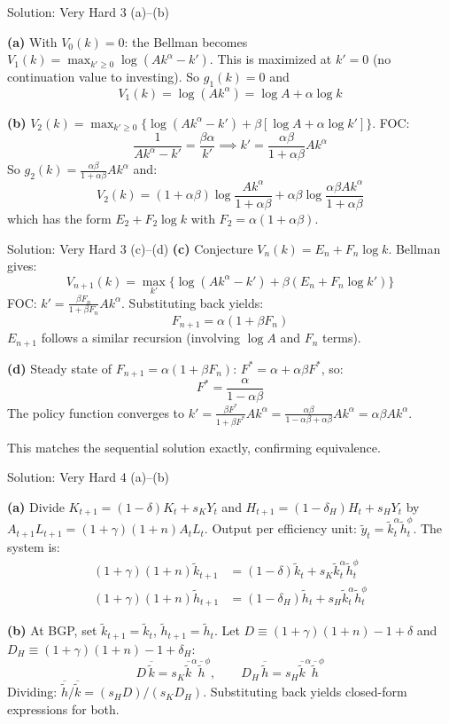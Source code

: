 \documentclass[aspectratio=169,10pt]{beamer}
\newcommand{\backbutton}[1]{\hfill\hyperlink{#1}{\beamerbutton{Back}}}
\begin{document}
\begin{frame}{Solution: Very Hard 3 (a)--(b)}
\hypertarget{s-v3}{}

\textbf{(a)} With $V_0(k)=0$: the Bellman becomes $V_1(k) = \max_{k'\geq 0}\log(Ak^\alpha - k')$. This is maximized at $k'=0$ (no continuation value to investing). So $g_1(k)=0$ and
\[
V_1(k) = \log(Ak^\alpha) = \log A + \alpha\log k
\]

\textbf{(b)} $V_2(k) = \max_{k'\geq 0}\{\log(Ak^\alpha - k') + \beta[\log A + \alpha\log k']\}$. FOC:
\[
\frac{1}{Ak^\alpha - k'} = \frac{\beta\alpha}{k'} \implies k' = \frac{\alpha\beta}{1+\alpha\beta}Ak^\alpha
\]
So $g_2(k) = \frac{\alpha\beta}{1+\alpha\beta}Ak^\alpha$ and:
\[
V_2(k) = (1+\alpha\beta)\log\frac{Ak^\alpha}{1+\alpha\beta} + \alpha\beta\log\frac{\alpha\beta Ak^\alpha}{1+\alpha\beta}
\]
which has the form $E_2 + F_2\log k$ with $F_2 = \alpha(1+\alpha\beta)$.
\end{frame}

\begin{frame}{Solution: Very Hard 3 (c)--(d)}
\textbf{(c)} Conjecture $V_n(k) = E_n + F_n\log k$. Bellman gives:
\[
V_{n+1}(k) = \max_{k'}\{\log(Ak^\alpha - k') + \beta(E_n + F_n\log k')\}
\]
FOC: $k' = \frac{\beta F_n}{1+\beta F_n}Ak^\alpha$. Substituting back yields:
\[
F_{n+1} = \alpha(1+\beta F_n)
\]
$E_{n+1}$ follows a similar recursion (involving $\log A$ and $F_n$ terms).

\medskip
\textbf{(d)} Steady state of $F_{n+1}=\alpha(1+\beta F_n)$: $F^* = \alpha + \alpha\beta F^*$, so:
\[
F^* = \frac{\alpha}{1-\alpha\beta}
\]
The policy function converges to $k' = \frac{\beta F^*}{1+\beta F^*}Ak^\alpha = \frac{\alpha\beta}{1-\alpha\beta+\alpha\beta}Ak^\alpha = \alpha\beta Ak^\alpha$.

This matches the sequential solution exactly, confirming equivalence.
\backbutton{q-v3}
\end{frame}

\begin{frame}{Solution: Very Hard 4 (a)--(b)}
\hypertarget{s-v4}{}

\textbf{(a)} Divide $K_{t+1}=(1-\delta)K_t+s_KY_t$ and $H_{t+1}=(1-\delta_H)H_t+s_HY_t$ by $A_{t+1}L_{t+1} = (1+\gamma)(1+n)A_tL_t$. Output per efficiency unit: $\tilde{y}_t = \tilde{k}_t^\alpha\tilde{h}_t^\phi$. The system is:
\begin{align*}
(1+\gamma)(1+n)\tilde{k}_{t+1} &= (1-\delta)\tilde{k}_t + s_K\tilde{k}_t^\alpha\tilde{h}_t^\phi \\
(1+\gamma)(1+n)\tilde{h}_{t+1} &= (1-\delta_H)\tilde{h}_t + s_H\tilde{k}_t^\alpha\tilde{h}_t^\phi
\end{align*}

\textbf{(b)} At BGP, set $\tilde{k}_{t+1}=\tilde{k}_t$, $\tilde{h}_{t+1}=\tilde{h}_t$. Let $D\equiv(1+\gamma)(1+n)-1+\delta$ and $D_H\equiv(1+\gamma)(1+n)-1+\delta_H$:
\[
D\,\overline{\tilde{k}} = s_K\overline{\tilde{k}}^\alpha\overline{\tilde{h}}^\phi, \qquad D_H\,\overline{\tilde{h}} = s_H\overline{\tilde{k}}^\alpha\overline{\tilde{h}}^\phi
\]
Dividing: $\overline{\tilde{h}}/\overline{\tilde{k}} = (s_H D)/(s_K D_H)$. Substituting back yields closed-form expressions for both.
\end{frame}
\end{document}
